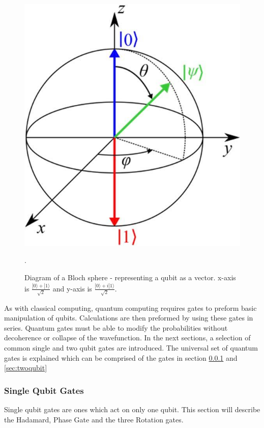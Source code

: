 \begin{figure}[H]
    \centering
    \includegraphics[scale=0.3]{images/Bloch-sphere-representation-of-a-qubit.png}
    \caption{Diagram of a Bloch sphere - 
 representing a qubit as a vector. x-axis is $\frac{|0\rangle + |1\rangle}{\sqrt{2}}$ and y-axis is $\frac{|0\rangle+i|1\rangle}{\sqrt{2}}$.\cite{sebastiano_cryo-cmos_2017}}. \label{fig:bloch}
\end{figure}

As with classical computing, quantum computing requires gates to preform basic manipulation of qubits. 
Calculations are then preformed by using these gates in series.
Quantum gates must be able to modify the probabilities without decoherence or collapse of the wavefunction. 
In the next sections, a selection of common single and two qubit gates are introduced.
The universal set of quantum gates is explained which can be comprised of the gates in section \ref{sec:singlequbit} and \ref{sec:twoqubit}  

\subsubsection{Single Qubit Gates}\label{sec:singlequbit}
Single qubit gates are ones which act on only one qubit. 
This section will describe the Hadamard, Phase Gate and the three Rotation gates. 

